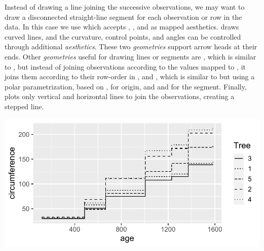 \documentclass[krantz2]{krantz}\usepackage{knitr}
\begin{document}
Instead of drawing a line joining the successive observations, we may want to draw a disconnected straight-line segment for each observation or row in the data. In this case we use  which accepts , ,  and  as mapped aesthetics.  draws curved lines, and the curvature, control points, and angles can be controlled through additional \emph{aesthetics}. These two \emph{geometries} support arrow heads at their ends. Other \emph{geometries} useful for drawing lines or segments are , which is similar to , but instead of joining observations according to the values mapped to , it joins them according to their row-order in , and , which is similar to  but using a polar parametrization, based on ,  for origin, and  and  for the segment. Finally,  plots only vertical and horizontal lines to join the observations, creating a stepped line.

\begin{knitrout}\footnotesize
{}\color{fgcolor}\begin{kframe}
\begin{alltt}
\hlstd{(} 
       \hlstd{(}      \hlopt{+}
  \hlstd{()}
\end{alltt}
\end{kframe}

{\centering \includegraphics[width=.7\textwidth]{figure/pos-step-plot-01-1} 

}



\end{knitrout}
\end{document}
